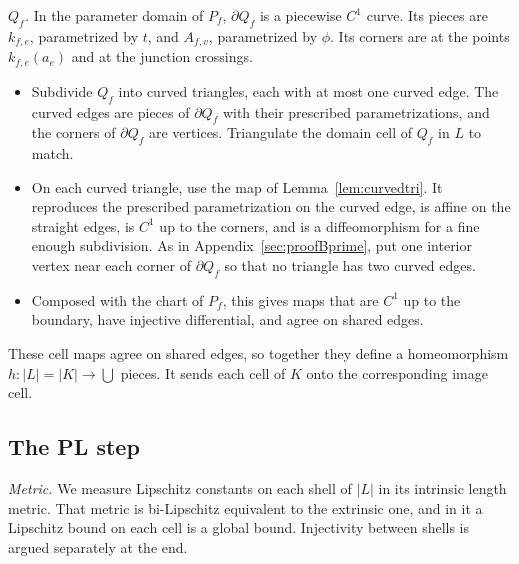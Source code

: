 \emph{$Q_f$.} In the parameter domain of $P_f$, $\partial Q_f$ is a piecewise $C^1$ curve. Its pieces are $k_{f,e}$,
parametrized by $t$, and $A_{f,v}$, parametrized by $\phi$. Its corners are at the points $k_{f,e}(a_e)$ and at the
junction crossings.
\begin{itemize}
\item Subdivide $Q_f$ into curved triangles, each with at most one curved edge. The curved edges are pieces of
$\partial Q_f$ with their prescribed parametrizations, and the corners of $\partial Q_f$ are vertices. Triangulate the
domain cell of $Q_f$ in $L$ to match.
\item On each curved triangle, use the map of Lemma~\ref{lem:curvedtri}. It reproduces the prescribed
parametrization on the curved edge, is affine on the straight edges, is $C^1$ up to the corners, and is a diffeomorphism
for a fine enough subdivision. As in Appendix~\ref{sec:proofBprime}, put one interior vertex near each corner of
$\partial Q_f$ so that no triangle has two curved edges.
\item Composed with the chart of $P_f$, this gives maps that are $C^1$ up to the boundary, have injective
differential, and agree on shared edges.
\end{itemize}

These cell maps agree on shared edges, so together they define a homeomorphism $h\colon|L|=|K|\to\bigcup$ pieces. It
sends each cell of $K$ onto the corresponding image cell.

\subsection{The PL step}
\emph{Metric.} We measure Lipschitz constants on each shell of $|L|$ in its intrinsic length metric. That metric is
bi-Lipschitz equivalent to the extrinsic one, and in it a Lipschitz bound on each cell is a global bound. Injectivity
between shells is argued separately at the end.

